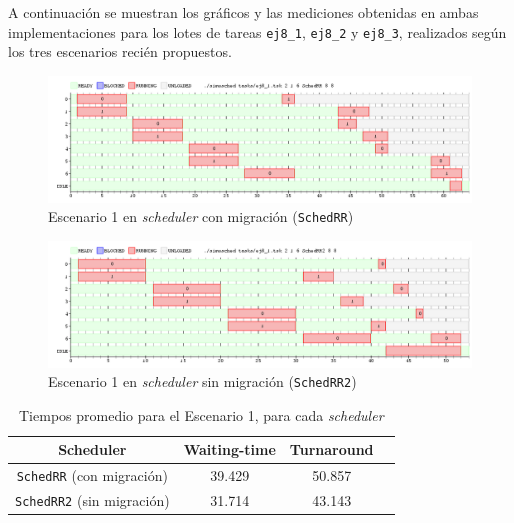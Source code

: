 A continuación se muestran los gráficos y las mediciones obtenidas en ambas
implementaciones para los lotes de tareas \texttt{ej8\_1}, \texttt{ej8\_2} y
\texttt{ej8\_3}, realizados según los tres escenarios recién propuestos.

\begin{figure}[H]
    \begin{center}
        \includegraphics[width=1\columnwidth]{imagenes/ej8_1_rr.png}
        \caption{Escenario 1 en \emph{scheduler} con migración (\texttt{SchedRR})}
    \end{center}
\end{figure}

\begin{figure}[H]
    \begin{center}
        \includegraphics[width=1\columnwidth]{imagenes/ej8_1_rr2.png}
        \caption{Escenario 1 en \emph{scheduler} sin migración (\texttt{SchedRR2})}
    \end{center}
\end{figure}

\begin{table}[H]
    \begin{center}
        \begin{tabular}{|c|c|c|c|}
            \hline
            \textbf{Scheduler}                 & \textbf{Waiting-time} & \textbf{Turnaround} \\ \hline
            \texttt{SchedRR} (con migración)   & 39.429                & 50.857 \\
            \texttt{SchedRR2} (sin migración)  & 31.714                & 43.143 \\ \hline
        \end{tabular}
        \caption{Tiempos promedio para el Escenario 1, para cada \emph{scheduler}}
    \end{center}
\end{table}



